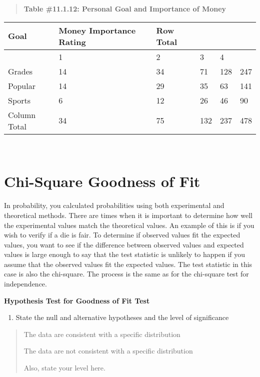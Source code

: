 \documentclass[]{book}
\providecommand{\tightlist}{%
  \setlength{\itemsep}{0pt}\setlength{\parskip}{0pt}}
\begin{document}
\begin{quote}
\textbf{Table \#11.1.12: Personal Goal and Importance of Money}
\end{quote}

\begin{longtable}[]{@{}llllll@{}}
\toprule
Goal & Money Importance Rating & Row Total & & &\tabularnewline
\midrule
\endhead
& 1 & 2 & 3 & 4 &\tabularnewline
Grades & 14 & 34 & 71 & 128 & 247\tabularnewline
Popular & 14 & 29 & 35 & 63 & 141\tabularnewline
Sports & 6 & 12 & 26 & 46 & 90\tabularnewline
Column Total & 34 & 75 & 132 & 237 & 478\tabularnewline
\bottomrule
\end{longtable}

\textbf{\\
}

\hypertarget{chi-square-goodness-of-fit}{%
\section{Chi-Square Goodness of Fit}\label{chi-square-goodness-of-fit}}

In probability, you calculated probabilities using both experimental and theoretical methods. There are times when it is important to determine how well the experimental values match the theoretical values. An example of this is if you wish to verify if a die is fair. To determine if observed values fit the expected values, you want to see if the difference between observed values and expected values is large enough to say that the test statistic is unlikely to happen if you assume that the observed values fit the expected values. The test statistic in this case is also the chi-square. The process is the same as for the chi-square test for independence.

\textbf{Hypothesis Test for Goodness of Fit Test}

\begin{enumerate}
\def\labelenumi{\arabic{enumi}.}
\tightlist
\item
  State the null and alternative hypotheses and the level of significance
\end{enumerate}

\begin{quote}
The data are consistent with a specific distribution

The data are not consistent with a specific distribution

Also, state your level here.
\end{quote}
\end{document}
